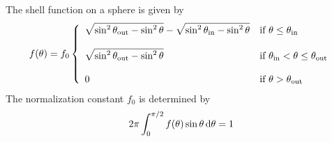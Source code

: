\documentclass{article}[12pt,a4]
\begin{document}
The shell function on a sphere is given by
\begin{equation}
f(\theta) = f_0 \left \{
   \begin{array}{l l}
      \displaystyle
      \sqrt{ \sin^2 \theta_{\rm out} - \sin^2 \theta } - \sqrt{ \sin^2 \theta_{\rm in} - \sin^2 \theta }
      & \mbox{if $\theta \le \theta_{\rm in}$} \\
      \\
     \displaystyle
      \sqrt{ \sin^2 \theta_{\rm out} - \sin^2 \theta }
      & \mbox{if $\theta_{\rm in} < \theta \le \theta_{\rm out}$} \\
      \\
     \displaystyle
     0 & \mbox{if $\theta > \theta_{\rm out}$}
   \end{array}
   \right .
\end{equation}
The normalization constant $f_0$ is determined by
\begin{equation}
2 \pi \int_0^{\pi/2} f(\theta) \sin \theta \, {\rm d}\theta = 1
\end{equation}
\end{document}
